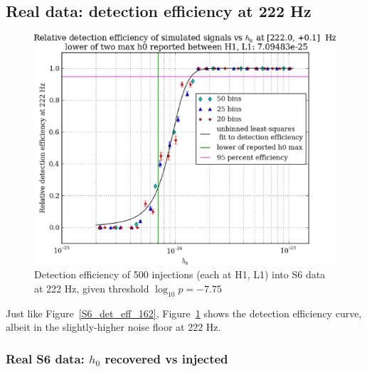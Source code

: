 


\subsection{Real data: detection efficiency at 222 Hz}

\begin{figure}
\begin{center}
\includegraphics[width=0.70\paperwidth,height=0.48\paperheight]{plots/detectionEfficiencyh0-222-0Hz.eps}
\caption{
Detection efficiency of 500 injections (each at H1, L1) into
S6 data at 222 Hz, given threshold $\log_{10}p = -7.75$}
\label{S6_det_eff_222}
\end{center}
\end{figure}

Just like Figure~\ref{S6_det_eff_162}, Figure~\ref{S6_det_eff_222} shows the detection efficiency curve, albeit in the slightly-higher noise floor at 222 Hz.

\subsubsection{Real S6 data: $h_0$ recovered vs injected}

